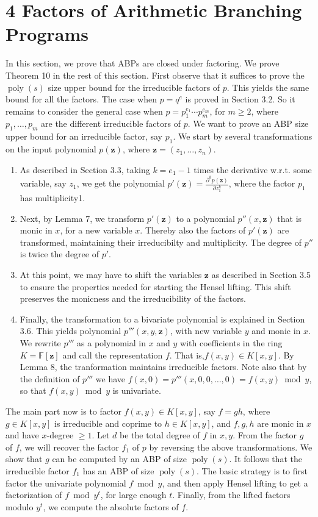 \section*{4 Factors of Arithmetic Branching Programs}
In this section, we prove that ABPs are closed under factoring.
\setcounter{nttheorem}{10}
We prove Theorem 10 in the rest of this section. First observe that it suffices to prove the $\operatorname{poly}(s)$ size upper bound for the irreducible factors of $p$. This yields the same bound for all the factors. The case when $p=q^e$ is proved in Section 3.2. So it remains to consider the general case when $p=p_1^{e_1}\cdots p_m^{e_m}$, for $m\geq2$, where $p_1,\ldots,p_m$ are the different irreducible factors of $p$. We want to prove an ABP size upper bound for an irreducible factor, say $p_1$.
We start by several transformations on the input polynomial $p(\mathbf z)$, where $\mathbf z=(z_1,\ldots,z_n)$.
\begin{enumerate}
\item As described in Section 3.3, taking $k=e_1-1$ times the derivative w.r.t. some variable, say $z_1$, we get the polynomial $p'(\mathbf z)=\frac{\partial^kp(\mathbf z)}{\partial z_1^k}$, where the factor $p_1$ has multiplicity1.
\item Next, by Lemma 7, we transform $p'(\mathbf z)$ to a polynomial $p''(x,\mathbf z)$ that is monic in $x$, for a new variable $x$. Thereby also the factors of $p'(\mathbf z)$ are transformed, maintaining their irreducibilty and multiplicity. The degree of $p''$ is twice the degree of $p'$.
\item At this point, we may have to shift the variables $\mathbf z$ as described in Section 3.5 to ensure the properties needed for starting the Hensel lifting. This shift preserves the monicness and the irreducibility of the factors.
\item Finally, the transformation to a bivariate polynomial is explained in Section 3.6. This yields polynomial $p'''(x,y,\mathbf z)$, with new variable $y$ and monic in $x$. We rewrite $p'''$ as a polynomial in $x$ and $y$ with coefficients in the ring $K=\mathbb F[\mathbf z]$ and call the representation $f$. That is,$f(x,y)\in K[x,y]$. By Lemma 8, the tranformation maintains irreducible factors. Note also that by the definition of $p'''$ we have $f(x,0)=p'''(x,0,0,\ldots,0)=f(x,y)\bmod y$, so that $f(x,y)\bmod y$ is univariate.
\end{enumerate}
The main part now is to factor $f(x,y)\in K[x,y]$, say $f=gh$, where $g\in K[x,y]$ is irreducible and coprime to $h\in K[x,y]$, and $f,g,h$ are monic in $x$ and have $x$-degree $\geq1$. Let $d$ be the total degree of $f$ in $x,y$.
From the factor $g$ of $f$, we will recover the factor $f_1$ of $p$ by reversing the above transformations. We show that $g$ can be computed by an ABP of size $\operatorname{poly}(s)$. It follows that the irreducible factor $f_1$ has an ABP of size $\operatorname{poly}(s)$.
The basic strategy is to first factor the univariate polynomial $f\bmod y$, and then apply Hensel lifting to get a factorization of $f\bmod y^t$, for large enough $t$. Finally, from the lifted factors modulo $y^t$, we compute the absolute factors of $f$.
